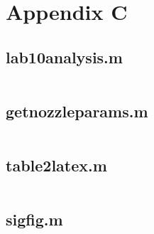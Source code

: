 \chapter{Appendix C} \label{cp:scripts}

\section{lab10analysis.m}

\inputminted{matlab}{Code/lab10analysis.m} \label{listing:data_analysis_script}

\section{getnozzleparams.m}

\inputminted{matlab}{Code/getnozzleparams.m} \label{listing:helper_function_script}

\section{table2latex.m}

\inputminted{matlab}{Code/table2latex.m} \label{listing:table2latex_script}

\section{sigfig.m}

\inputminted{matlab}{Code/sigfig.m} \label{listing:sigfig_script}
